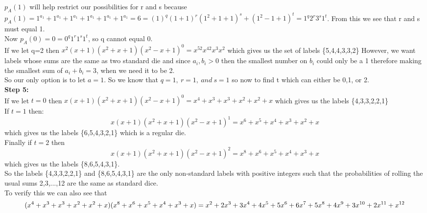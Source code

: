 \documentclass[10pt,a4paper]{report}
\begin{document}
	$p_A(1)$ will help restrict our possibilities for r and s because $p_A(1) = 1^{a_1} + 1^{a_1} + 1^{a_1} + 1^{a_1} + 1^{a_1} + 1^{a_1} = 6 = (1)^q(1+1)^r(1^2+1+1)^s+(1^2 - 1 + 1)^t = 1^q2^r3^s1^t$.  From this we see that r and s must equal 1.\\
	\newline
	Now $p_A(0) = 0 = 0^q1^r1^s1^t$, so q cannot equal 0.\\
	If we let q=2 then $x^2(x+1)(x^2+x+1)(x^2-x+1)^0 = x^52x^42x^3x^2$ which gives us the set of labels \{5,4,4,3,3,2\} However, we want labels whose sums are the same as two standard die and since $a_i,b_i > 0$ then the smallest number on $b_i$ could only be a 1 therefore making the smallest sum of $a_i+b_i = 3$, when we need it to be 2.\\
	So our only option is to let $a=1$. So we know that $q=1,\ r=1,\ and\ s=1$ so now to find t which can either be 0,1, or 2.\\
	\newline
	\textbf{Step 5:}\\
	If we let $t=0$ then $x(x+1)(x^2+x+1)(x^2-x+1)^0 = x^4 + x^3 + x^3 + x^2 + x^2 + x$ which gives us the labels \{4,3,3,2,2,1\}\\
	\newline
	If $t = 1$ then:\\
	\[x(x+1)(x^2+x+1)(x^2-x+1)^1 = x^6 + x^5 + x^4 + x^3 + x^2 + x\]
	which gives us the labels \{6,5,4,3,2,1\} which is a regular die.\\
	Finally if $t=2$ then
	\[x(x+1)(x^2+x+1)(x^2-x+1)^2 = x^8 + x^6 + x^5 + x^4 + x^3 + x \]
	which gives us the labels \{8,6,5,4,3,1\}.\\
	\newline
	So the labels \{4,3,3,2,2,1\} and \{8,6,5,4,3,1\} are the only non-standard labels with positive integers such that the probabilities of rolling the usual sums 2,3,...,12 are the same as standard dice.\\
	To verify this we can also see that
	\[(x^4 + x^3 + x^3 + x^2 + x^2 + x)(x^8 + x^6 + x^5 + x^4 + x^3 + x)\\= x^2 + 2x^3 + 3x^4 + 4x^5 + 5x^6 + 6x^7 + 5x^8 + 4x^9 + 3x^{10} + 2x^{11} + x^{12} \]
	
	
	
	
\end{document}
